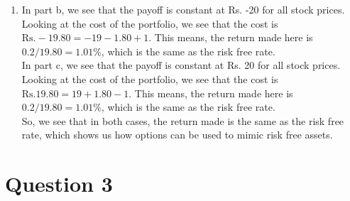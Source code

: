 \documentclass[a4paper]{article}
\begin{document}
\begin{enumerate}[label=(\alph*)]
    \item In part b, we see that the payoff is constant at Rs. -20 for all stock prices. Looking at the cost of the portfolio, we see that the cost is $\text{Rs.} -19.80 = -19 - 1.80 + 1$. This means, the return made here is $0.2/19.80 = 1.01\%$, which is the same as the risk free rate. \\

    In part c, we see that the payoff is constant at Rs. 20 for all stock prices. Looking at the cost of the portfolio, we see that the cost is $\text{Rs.} 19.80 = 19 + 1.80 - 1$. This means, the return made here is $0.2/19.80 = 1.01\%$, which is the same as the risk free rate. \\

    So, we see that in both cases, the return made is the same as the risk free rate, which shows us how options can be used to mimic risk free assets.
\end{enumerate}


\newpage
\section*{Question 3}
\end{document}

